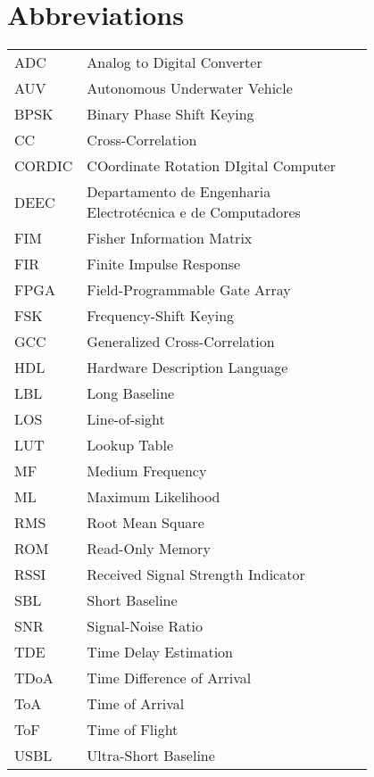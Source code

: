 \chapter*{Abbreviations}

\begin{flushleft}
\begin{tabular}{l p{0.8\linewidth}}
ADC	    	 & Analog to Digital Converter \\
AUV			 & Autonomous Underwater Vehicle \\
BPSK    	& Binary Phase Shift Keying \\
CC 		  		& Cross-Correlation \\
CORDIC 	 & COordinate Rotation DIgital Computer \\
DEEC		& Departamento de Engenharia Electrotécnica e de Computadores \\
FIM		  	& Fisher Information Matrix \\
FIR 	   	& Finite Impulse Response \\
FPGA    & Field-Programmable Gate Array \\
FSK		  & Frequency-Shift Keying \\
GCC      & Generalized Cross-Correlation \\
HDL		 & Hardware Description Language\\
LBL		  & Long Baseline\\
LOS		 & Line-of-sight\\
LUT     & Lookup Table \\
MF		  & Medium Frequency \\
ML		  & Maximum Likelihood \\
RMS		 & Root Mean Square \\
ROM     & Read-Only Memory \\
RSSI 	  & Received Signal Strength Indicator \\
SBL		  & Short Baseline \\
SNR		 & Signal-Noise Ratio\\
TDE 	 & Time Delay Estimation \\
TDoA    & Time Difference of Arrival \\
ToA	   	& Time of Arrival \\
ToF		 & Time of Flight \\
USBL    & Ultra-Short Baseline
\end{tabular}
\end{flushleft}